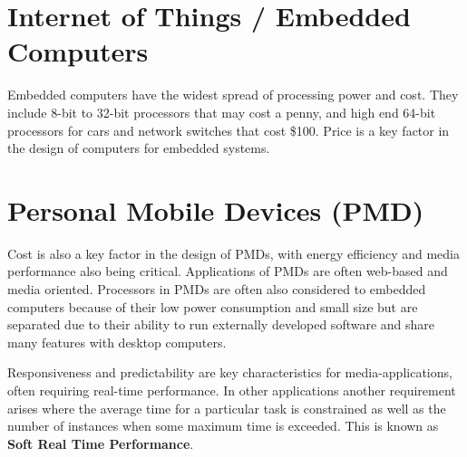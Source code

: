 \documentclass[12pt letter]{report}
\begin{document}
\section{Internet of Things / Embedded Computers}



Embedded computers have the widest spread of processing power and cost. They include 8-bit to 32-bit processors that may
cost a penny, and high end 64-bit processors for cars and network switches that cost \$100. Price is a key factor in the
design of computers for embedded systems.


\section{Personal Mobile Devices (PMD)}


Cost is also a key factor in the design of PMDs, with energy efficiency and media performance also being critical.
Applications of PMDs are often web-based and media oriented. Processors in PMDs are often also considered to embedded
computers because of their low power consumption and small size but are separated due to their ability to run externally
developed software and share many features with desktop computers.

Responsiveness and predictability are key characteristics for media-applications, often requiring real-time performance.
In other applications another requirement arises where the average time for a particular task is constrained as well as
the number of instances when some maximum time is exceeded. This is known as \textbf{Soft Real Time Performance}.
\end{document}
